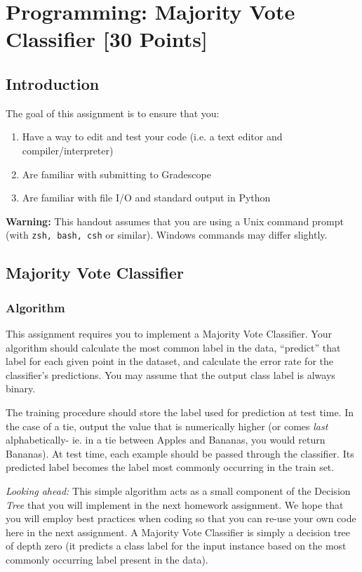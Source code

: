 \documentclass[11pt,addpoints,answers]{exam}
\begin{document}
\section{Programming: Majority Vote Classifier [30 Points]} 

\subsection{Introduction}
The goal of this assignment is to ensure that you:
\begin{enumerate}
    \item Have a way to edit and test your code (i.e. a text editor and compiler/interpreter)
    \item Are familiar with submitting to Gradescope
    \item Are familiar with file I/O and standard output in Python
\end{enumerate}

\textbf{Warning:} This handout assumes that you are using a Unix command prompt (with \texttt{zsh, bash, csh} or similar). Windows commands may differ slightly.

\subsection{Majority Vote Classifier}

\subsubsection{Algorithm}


This assignment requires you to implement a Majority Vote Classifier.  Your algorithm should calculate the most common label in the data, ``predict'' that label for each given point in the dataset, and calculate the error rate for the classifier's predictions. You may assume that the output class label is always binary. 

The training procedure should store the label used for prediction at test time. In the case of a tie, output the value that is numerically higher (or comes \emph{last} alphabetically- ie. in a tie between Apples and Bananas, you would return Bananas). At test time, each example should be passed through the classifier. Its predicted label becomes the label most commonly occurring in the train set. 

\emph{Looking ahead:} This simple algorithm acts as a small component of the Decision \emph{Tree} that you will implement in the next homework assignment. We hope that you will employ best practices when coding so that you can re-use your own code here in the next assignment. A Majority Vote Classifier is simply a decision tree of depth zero (it predicts a class label for the input instance based on the most commonly occurring label present in the data).
\end{document}
